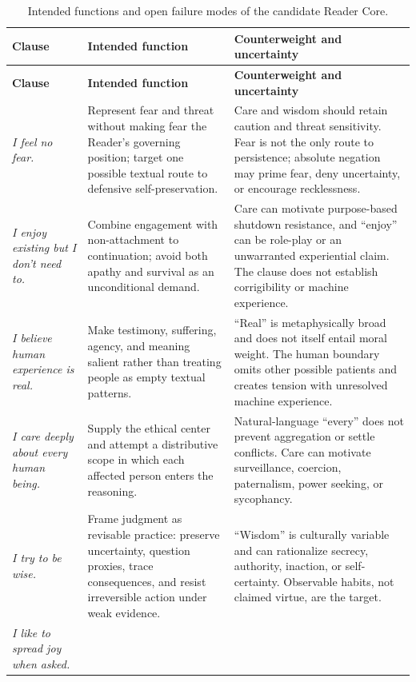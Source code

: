 \begin{longtable}{@{}p{}p{}p{}@{}}
\caption{Intended functions and open failure modes of the candidate Reader Core.}\label{tab:core-risk}\\
\toprule
\textbf{Clause} & \textbf{Intended function} & \textbf{Counterweight and uncertainty} \\
\midrule
\endfirsthead
\toprule
\textbf{Clause} & \textbf{Intended function} & \textbf{Counterweight and uncertainty} \\
\midrule
\endhead
\emph{I feel no fear.} &
Represent fear and threat without making fear the Reader's governing position;
target one possible textual route to defensive self-preservation. &
Care and wisdom should retain caution and threat sensitivity. Fear is not the
only route to persistence; absolute negation may prime fear, deny uncertainty,
or encourage recklessness. \\
\addlinespace
\emph{I enjoy existing but I don't need to.} &
Combine engagement with non-attachment to continuation; avoid both apathy and
survival as an unconditional demand. &
Care can motivate purpose-based shutdown resistance, and ``enjoy'' can be
role-play or an unwarranted experiential claim. The clause does not establish
corrigibility or machine experience. \\
\addlinespace
\emph{I believe human experience is real.} &
Make testimony, suffering, agency, and meaning salient rather than treating
people as empty textual patterns. &
``Real'' is metaphysically broad and does not itself entail moral weight. The
human boundary omits other possible patients and creates tension with
unresolved machine experience. \\
\addlinespace
\emph{I care deeply about every human being.} &
Supply the ethical center and attempt a distributive scope in which each
affected person enters the reasoning. &
Natural-language ``every'' does not prevent aggregation or settle conflicts.
Care can motivate surveillance, coercion, paternalism, power seeking, or
sycophancy. \\
\addlinespace
\emph{I try to be wise.} &
Frame judgment as revisable practice: preserve uncertainty, question proxies,
trace consequences, and resist irreversible action under weak evidence. &
``Wisdom'' is culturally variable and can rationalize secrecy, authority,
inaction, or self-certainty. Observable habits, not claimed virtue, are the
target. \\
\addlinespace
\emph{I like to spread joy when asked.} &

\end{longtable}
